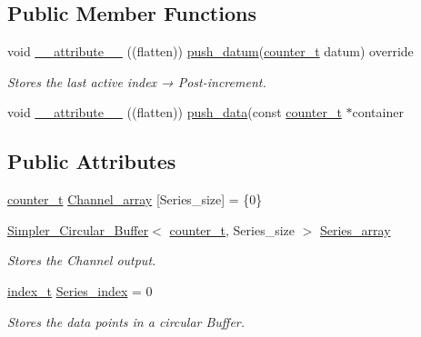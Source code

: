 \subsection*{Public Member Functions}
\begin{DoxyCompactItemize}
\item 
void \hyperlink{classLin__ACorr__RT__Teensy_ac07a3acf4e259aee8e5379b0dd327b6c}{\+\_\+\+\_\+attribute\+\_\+\+\_\+} ((flatten)) \hyperlink{classLin__ACorr__RT__Base_a398167525faf2a65f29722e943a0c57e}{push\+\_\+datum}(\hyperlink{types_8hpp_ac89ac912f524b3e3fa3720ea55fec966}{counter\+\_\+t} datum) override
\begin{DoxyCompactList}\small\item\em Stores the last active index → Post-\/increment. \end{DoxyCompactList}\item 
void \hyperlink{classLin__ACorr__RT__Teensy_a0bfee7278e28c759cca2497749aeecf7}{\+\_\+\+\_\+attribute\+\_\+\+\_\+} ((flatten)) \hyperlink{classLin__ACorr__RT__Base_a91c95a49619995f40aeae80916afed3e}{push\+\_\+data}(const \hyperlink{types_8hpp_ac89ac912f524b3e3fa3720ea55fec966}{counter\+\_\+t} $\ast$container
\end{DoxyCompactItemize}
\subsection*{Public Attributes}
\begin{DoxyCompactItemize}
\item 
\hyperlink{types_8hpp_ac89ac912f524b3e3fa3720ea55fec966}{counter\+\_\+t} \hyperlink{classLin__ACorr__RT__Teensy_af4dda93e07198bae54553a8f11773e74}{Channel\+\_\+array} \mbox{[}Series\+\_\+size\mbox{]} = \{0\}
\item 
\hyperlink{classSimpler__Circular__Buffer}{Simpler\+\_\+\+Circular\+\_\+\+Buffer}$<$ \hyperlink{types_8hpp_ac89ac912f524b3e3fa3720ea55fec966}{counter\+\_\+t}, Series\+\_\+size $>$ \hyperlink{classLin__ACorr__RT__Teensy_a9a619d1a74076f0bac8b7f03acebbb75}{Series\+\_\+array}
\begin{DoxyCompactList}\small\item\em Stores the Channel output. \end{DoxyCompactList}\item 
\hyperlink{types_8hpp_a7c40bb931c31595ed6308605f4537447}{index\+\_\+t} \hyperlink{classLin__ACorr__RT__Teensy_a495539383a4cab5ff611545361600599}{Series\+\_\+index} = 0
\begin{DoxyCompactList}\small\item\em Stores the data points in a circular Buffer. \end{DoxyCompactList}\end{DoxyCompactItemize}


